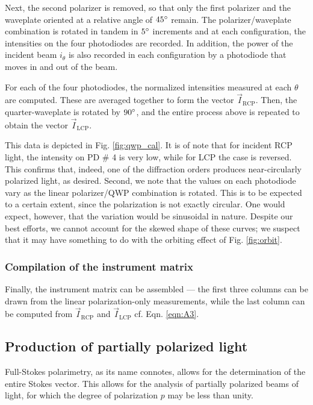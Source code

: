 \documentclass[footinbib,aps,prl,superscriptaddress]{revtex4-1}
\begin{document}
Next, the second polarizer is removed, so that only the first polarizer and the waveplate oriented at a relative angle of $45\degree$ remain. The polarizer/waveplate combination is rotated in tandem in $5\degree$ increments and at each configuration, the intensities on the four photodiodes are recorded. In addition, the power of the incident beam $i_{\theta}$ is also recorded in each configuration by a photodiode that moves in and out of the beam.

For each of the four photodiodes, the normalized intensities measured at each $\theta$ are computed. These are averaged together to form the vector $\vec{I}_{\text{RCP}}$.  Then, the quarter-waveplate is rotated by $90\degree$, and the entire process above is repeated to obtain the vector $\vec{I}_{\text{LCP}}$.

This data is depicted in Fig. \ref{fig:qwp_cal}. It is of note that for incident RCP light, the intensity on PD \# 4 is very low, while for LCP the case is reversed. This confirms that, indeed, one of the diffraction orders produces near-circularly polarized light, as desired. Second, we note that the values on each photodiode vary as the linear polarizer/QWP combination is rotated. This is to be expected to a certain extent, since the polarization is not exactly circular. One would expect, however, that the variation would be sinusoidal in nature. Despite our best efforts, we cannot account for the skewed shape of these curves; we suspect that it may have something to do with the orbiting effect of Fig. \ref{fig:orbit}.

\subsubsection{Compilation of the instrument matrix}

Finally, the instrument matrix can be assembled --- the first three columns can be drawn from the linear polarization-only measurements, while the last column can be computed from $\vec{I}_{\text{RCP}}$ and $\vec{I}_{\text{LCP}}$ cf. Eqn. \ref{eqn:A3}.

\subsection{Production of partially polarized light}

Full-Stokes polarimetry, as its name connotes, allows for the determination of the entire Stokes vector. This allows for the analysis of partially polarized beams of light, for which the degree of polarization $p$ may be less than unity.
\end{document}

